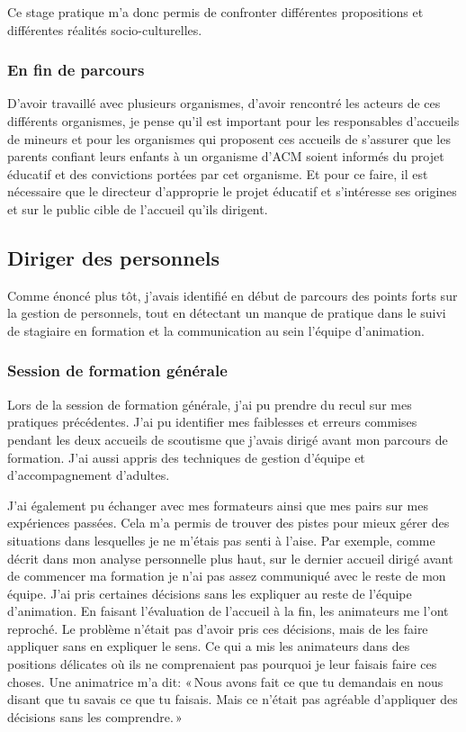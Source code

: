 \documentclass[titlepage,11pt,a4paper]{article}
\begin{document}
Ce stage pratique m'a donc permis de confronter différentes propositions et différentes
réalités socio-culturelles.

\subsubsection{En fin de parcours}

D'avoir travaillé avec plusieurs organismes, d'avoir rencontré les acteurs de ces
différents organismes, je pense qu'il est important pour les responsables d'accueils de
mineurs et pour les organismes qui proposent ces accueils de s'assurer que les parents
confiant leurs enfants à un organisme d’ACM soient informés du projet éducatif et des
convictions portées par cet organisme. Et pour ce faire, il est nécessaire que le
directeur d'approprie le projet éducatif et s'intéresse ses origines et sur le public cible de
l'accueil qu'ils dirigent.

\subsection{Diriger des personnels}

Comme énoncé plus tôt, j'avais identifié en début de parcours des points forts sur la
gestion de personnels, tout en détectant un manque de pratique dans le suivi de stagiaire
en formation et la communication au sein l'équipe d'animation.

\subsubsection{Session de formation générale}

Lors de la session de formation générale, j'ai pu prendre du recul sur mes pratiques
précédentes. J'ai pu identifier mes faiblesses et erreurs commises pendant les deux
accueils de scoutisme que j'avais dirigé avant mon parcours de formation. J'ai aussi
appris des techniques de gestion d'équipe et d'accompagnement d'adultes.

J'ai également pu échanger avec mes formateurs ainsi que mes pairs sur mes expériences
passées. Cela m'a permis de trouver des pistes pour mieux gérer des situations dans lesquelles
je ne m'étais pas senti à l'aise. Par exemple, comme décrit dans mon analyse personnelle
plus haut, sur le dernier accueil dirigé avant de commencer ma formation je n'ai pas assez
communiqué avec le reste de mon équipe. J'ai pris certaines décisions sans les expliquer
au reste de l'équipe d'animation. En faisant l'évaluation de l'accueil à la fin, les
animateurs me l'ont reproché. Le problème n'était pas d'avoir pris ces décisions, mais de
les faire appliquer sans en expliquer le sens. Ce qui a mis les animateurs dans des
positions délicates où ils ne comprenaient pas pourquoi je leur faisais faire ces choses.
Une animatrice m'a dit: «\,Nous avons fait ce que tu demandais en nous disant que tu
savais ce que tu faisais. Mais ce n'était pas agréable d'appliquer des décisions sans les
comprendre.\,»
\end{document}
